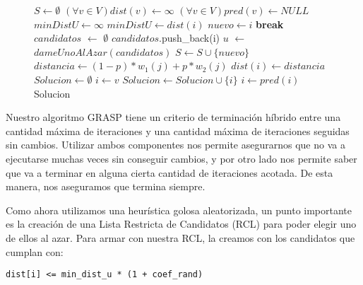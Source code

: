 \begin{center}
 \begin{figure}[H]
  \begin{pseudo}
    \State $S \leftarrow \emptyset$
    \State $(\forall v \in V) dist(v) \leftarrow \infty$
    \State $(\forall v \in V) pred(v) \leftarrow NULL$
    \State $minDistU \leftarrow \infty$
	\State $minDistU \leftarrow dist(i)$
	\State $nuevo \leftarrow i$
      \EndIf
    \EndFor
      \State \textbf{break}
    \EndIf
    \State $candidatos$ $\leftarrow$ $\emptyset$
	\State $candidatos$.push\_back(i)
      \EndIf
    \EndFor
    \State $u$ $\leftarrow$ $dameUnoAlAzar(candidatos)$
    \State $S \leftarrow S \cup \{nuevo\}$
      \State $distancia \leftarrow (1-p)*w_1(j) + p*w_2(j)$
	\State $dist(i) \leftarrow distancia$
      \EndIf
    \EndFor
    \EndWhile
    \State $Solucion \leftarrow \emptyset$
    \State $i \leftarrow v$
      \State $Solucion \leftarrow Solucion \cup \{i\}$
      \State $i \leftarrow pred(i)$
    \EndWhile
    \Return Solucion
    \EndProcedure
  \end{pseudo}
 \end{figure}
\end{center}

Nuestro algoritmo GRASP tiene un criterio de terminación híbrido entre una cantidad máxima de iteraciones y una cantidad máxima de iteraciones seguidas sin cambios. Utilizar ambos componentes nos permite asegurarnos que no va a ejecutarse muchas veces sin conseguir cambios, y por otro lado nos permite saber que va a terminar en alguna cierta cantidad de iteraciones acotada. De esta manera, nos aseguramos que termina siempre.

Como ahora utilizamos una heurística golosa aleatorizada, un punto importante es la creación de una Lista Restricta de Candidatos (RCL) para poder elegir uno de ellos al azar. Para armar con nuestra RCL, la creamos con los candidatos que cumplan con:

\begin{verbatim}
dist[i] <= min_dist_u * (1 + coef_rand)
\end{verbatim}

